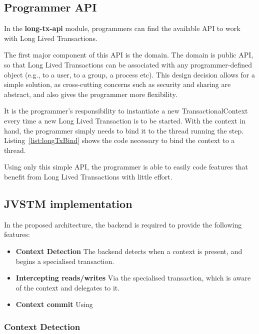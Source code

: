 \subsection{Programmer API}

In the {\bf long-tx-api} module, programmers can find the available
API to work with Long Lived Transactions.

The first major component of this API is the domain. The domain is
public API, so that Long Lived Transactions can be associated with any
programmer-defined object (e.g., to a user, to a group, a process
etc). This design decision allows for a simple solution, as
cross-cutting concerns such as security and sharing are abstract, and
also gives the programmer more flexibility.

It is the programmer's responsibility to instantiate a new
TransactionalContext every time a new Long Lived Transaction is to be
started. With the context in hand, the programmer simply needs to bind
it to the thread running the step. Listing~\ref{list:longTxBind} shows
the code necessary to bind the context to a thread.

Using only this simple API, the programmer is able to easily code
features that benefit from Long Lived Transactions with little effort.

\subsection{JVSTM implementation}

In the proposed architecture, the backend is required to provide the
following features:

\begin{itemize}

\item {\bf Context Detection} The backend detects when a context is
  present, and begins a specialised transaction.

\item {\bf Intercepting reads/writes} Via the specialised transaction,
  which is aware of the context and delegates to it.

\item {\bf Context commit} Using 

\end{itemize}

\subsubsection{Context Detection}

